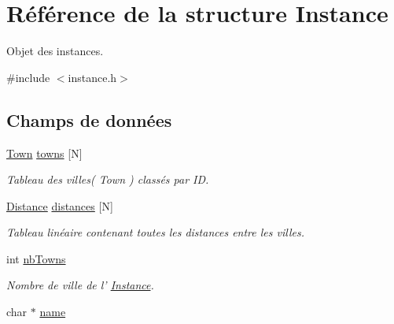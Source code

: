 \hypertarget{structInstance}{
\section{Référence de la structure Instance}
\label{structInstance}
}


Objet des instances.  




{\ttfamily \#include $<$instance.h$>$}

\subsection*{Champs de données}
\begin{DoxyCompactItemize}
\item 
\hypertarget{structInstance_a2087c5ae925e10c023ab75ae949b3a8c}{
\hyperlink{structTown}{Town} \hyperlink{structInstance_a2087c5ae925e10c023ab75ae949b3a8c}{towns} \mbox{[}N\mbox{]}}
\label{structInstance_a2087c5ae925e10c023ab75ae949b3a8c}

\begin{DoxyCompactList}\small\item\em Tableau des villes( Town ) classés par ID. \item\end{DoxyCompactList}\item 
\hypertarget{structInstance_a4737b2c817f2a1d43e15c370dbdd10b2}{
\hyperlink{structDistance}{Distance} \hyperlink{structInstance_a4737b2c817f2a1d43e15c370dbdd10b2}{distances} \mbox{[}N\mbox{]}}
\label{structInstance_a4737b2c817f2a1d43e15c370dbdd10b2}

\begin{DoxyCompactList}\small\item\em Tableau linéaire contenant toutes les distances entre les villes. \item\end{DoxyCompactList}\item 
\hypertarget{structInstance_aef5e944d6f236c31f03a4a9886e8ab99}{
int \hyperlink{structInstance_aef5e944d6f236c31f03a4a9886e8ab99}{nbTowns}}
\label{structInstance_aef5e944d6f236c31f03a4a9886e8ab99}

\begin{DoxyCompactList}\small\item\em Nombre de ville de l' \hyperlink{structInstance}{Instance}. \item\end{DoxyCompactList}\item 
\hypertarget{structInstance_a7822b9a12232dac563bd744f399cae76}{
char $\ast$ \hyperlink{structInstance_a7822b9a12232dac563bd744f399cae76}{name}}
\label{structInstance_a7822b9a12232dac563bd744f399cae76}


\end{DoxyCompactItemize}
